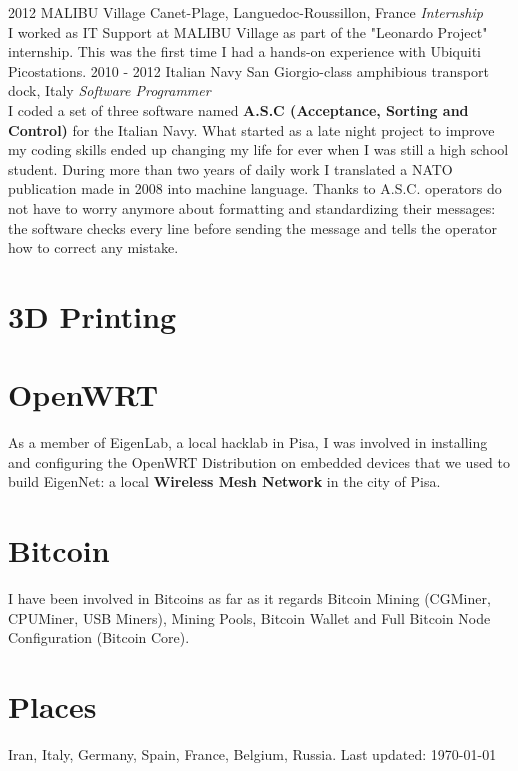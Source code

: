 \documentclass[]{friggeri-cv} %
\begin{document}
\begin{entrylist}
\entry
{2012}
{MALIBU Village}
{Canet-Plage, Languedoc-Roussillon, France}
{\emph{Internship} \\
I worked as IT Support at MALIBU Village as part of the "Leonardo Project" internship. This was the first time I had a hands-on experience with Ubiquiti Picostations.}
\entry
{2010 - 2012}
{Italian Navy}
{San Giorgio-class amphibious transport dock, Italy}
{\emph{Software Programmer} \\
I coded a set of three software named \textbf{A.S.C (Acceptance, Sorting and Control)} for the Italian Navy. What started as a late night project to improve my coding skills ended up changing my life for ever when I was still a high school student. During more than two years of daily work I translated a NATO publication made in 2008 into machine language. Thanks to A.S.C. operators do not have to worry anymore about formatting and standardizing their messages: the software checks every line before sending the message and tells the operator how to correct any mistake.}
\end{entrylist}

\newpage


\begin{aside}
\section{3D Printing \textcolor{red}{\faConnectdevelop}}
\section{OpenWRT \textcolor{green}{\faWifi}}
As a member of EigenLab, a local hacklab in Pisa, I was involved in installing and configuring the OpenWRT Distribution on embedded devices that we used to build EigenNet: a local \textbf{Wireless Mesh Network} in the city of Pisa.\vspace{6mm}
\section{Bitcoin \textcolor{red}{\faBitcoin}}
I have been involved in Bitcoins as far as it regards Bitcoin Mining (CGMiner, CPUMiner, USB Miners), Mining Pools, Bitcoin Wallet and Full Bitcoin Node Configuration (Bitcoin Core).\vspace{6mm}
\section{Places \textcolor{light-blue}{\faMapMarker}}
Iran, Italy, Germany, Spain, France, Belgium, Russia.\vspace{6mm}
\small{Last updated: \today\ }
\end{aside}
\end{document}
